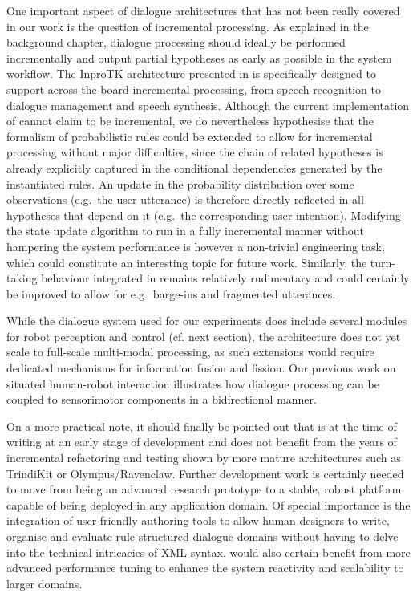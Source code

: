 One important aspect of dialogue architectures that has not been really covered in our work is the question of incremental processing.  As explained in the background chapter, dialogue processing should ideally be performed incrementally and output partial hypotheses as early as possible in the system workflow. The InproTK architecture presented in \cite{schlangen2009general,Baumann:2012} is specifically designed to support across-the-board incremental processing, from speech recognition to dialogue management and speech synthesis. Although the current implementation of \opendial{} cannot claim to be incremental, we do nevertheless hypothesise that the formalism of probabilistic rules could be extended to allow for incremental processing without major difficulties, since the chain of related hypotheses is already explicitly captured in the conditional dependencies generated by the instantiated rules.  An update in the probability distribution over some observations (e.g.\ the user utterance) is therefore directly reflected in all hypotheses that depend on it (e.g.\ the corresponding user intention). Modifying the state update algorithm to run in a fully incremental manner without hampering the system performance is however a non-trivial engineering task, which could constitute an interesting topic for future work. Similarly, the turn-taking behaviour integrated in \opendial{} remains relatively rudimentary and could certainly be improved to allow for e.g.\ barge-ins and fragmented utterances.

While the dialogue system used for our experiments does include several modules for robot perception and control (cf. next section), the architecture does not yet scale to full-scale multi-modal processing, as such extensions would require dedicated mechanisms for information fusion and fission. Our previous work on situated human-robot interaction \citep{cosybook:dialogue} illustrates how dialogue processing can be coupled to sensorimotor components in a bidirectional manner.  

On a more practical note, it should finally be pointed out that \opendial{} is at the time of writing at an early stage of development and does not benefit from the years of incremental refactoring and testing shown by more mature architectures such as TrindiKit or Olympus/Ravenclaw. Further development work is certainly needed to move \opendial{} from being an advanced research prototype to a stable, robust platform capable of being deployed in any application domain. Of special importance is the integration of user-friendly authoring tools to allow human designers to write, organise and evaluate rule-structured dialogue domains without having to delve into the technical intricacies of XML syntax. \opendial{} would also certain benefit from more advanced performance tuning to enhance the system reactivity and scalability to larger domains. 


